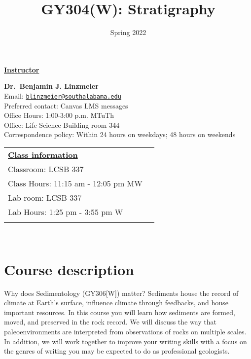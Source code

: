 \documentclass[11pt,]{article}
\title{GY304(W): Stratigraphy}
\date{Spring 2022}
\begin{document}
  

		\maketitle
		
	
		\thispagestyle{firststyle}

\textbf{\underline{Instructor}}
\begin{multicols}{2}

  \textbf{Dr.~Benjamin J. Linzmeier}\\
  Email: \href{mailto:blinzmeier@southalabama.edu}{\nolinkurl{blinzmeier@southalabama.edu}}\\
  Preferred contact: Canvas LMS messages\\
  Office Hours: 1:00-3:00 p.m. MTuTh\\
  Office: Life Science Building room 344\\
  Correspondence policy: Within 24 hours on weekdays; 48 hours on
weekends\\
    \columnbreak
    
  \end{multicols}
	
\noindent \begin{tabular*}{\textwidth}{ @{\extracolsep{\fill}} lr @{\extracolsep{\fill}}}
\textbf{\underline{Class information}}\\
  Classroom: LCSB 337\\
  Class Hours: 11:15 am - 12:05 pm MW\\
  Lab room: LCSB 337\\
  Lab Hours: 1:25 pm - 3:55 pm W\\
  \\
	\end{tabular*}\\


\vspace{2mm}


\hypertarget{course-description}{%
\section{Course description}\label{course-description}}

Why does Sedimentology (GY306{[}W{]}) matter? Sediments house the record
of climate at Earth's surface, influence climate through feedbacks, and
house important resources. In this course you will learn how sediments
are formed, moved, and preserved in the rock record. We will discuss the
way that paleoenvironments are interpreted from observations of rocks on
multiple scales. In addition, we will work together to improve your
writing skills with a focus on the genres of writing you may be expected
to do as professional geologists.
\end{document}
